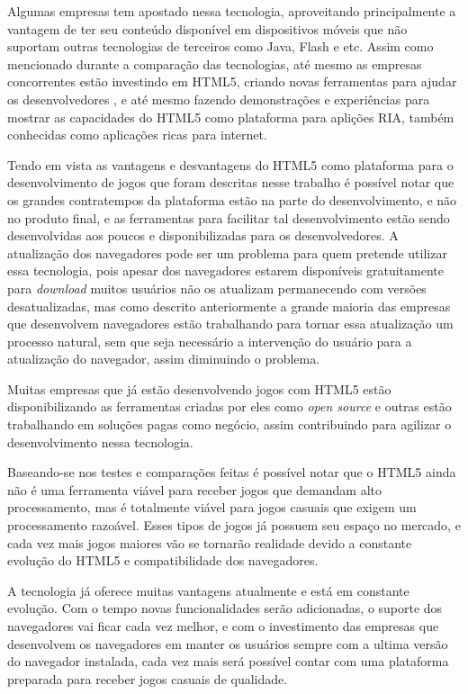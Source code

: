 Algumas empresas tem apostado nessa tecnologia, aproveitando
principalmente a vantagem de ter seu conteúdo disponível em
dispositivos móveis que não suportam outras tecnologias de terceiros
como Java, Flash e etc. Assim como mencionado durante a comparação das
tecnologias, até mesmo as empresas concorrentes estão investindo em
HTML5, criando novas ferramentas para ajudar
os desenvolvedores \cite{website:adobeedge}, e até mesmo fazendo
demonstrações e experiências para mostrar as capacidades do HTML5 como
plataforma para aplições RIA, também conhecidas como aplicações ricas
para internet.

Tendo em vista as vantagens e desvantagens do HTML5 como plataforma
para o desenvolvimento de jogos que foram descritas nesse trabalho é possível notar que os grandes
contratempos da plataforma estão na parte do desenvolvimento, e não no
produto final, e as ferramentas para facilitar tal desenvolvimento
estão sendo desenvolvidas aos poucos e disponibilizadas para os
desenvolvedores. A atualização dos navegadores pode ser um problema
para quem pretende utilizar essa tecnologia, pois apesar dos
navegadores estarem disponíveis gratuitamente para \textit{download}
muitos usuários não os atualizam permanecendo com versões
desatualizadas, mas como descrito anteriormente a grande maioria das empresas que desenvolvem
navegadores estão trabalhando para tornar essa atualização um processo
natural, sem que seja necessário a intervenção do usuário para a
atualização do navegador, assim diminuindo o problema.

Muitas empresas que já estão desenvolvendo jogos com HTML5
estão disponibilizando as ferramentas criadas por eles como
\textit{open source} e outras estão trabalhando em soluções pagas como
negócio, assim contribuindo para agilizar o desenvolvimento nessa
tecnologia.

Baseando-se nos testes e comparações feitas é possível notar que o
HTML5 ainda não é uma ferramenta viável para receber jogos que
demandam alto processamento, mas é totalmente viável para jogos
casuais que exigem um processamento razoável. Esses tipos de jogos já possuem seu espaço no
mercado, e cada vez mais jogos maiores vão se tornarão realidade devido a constante evolução
do HTML5 e compatibilidade dos navegadores.

A tecnologia já oferece muitas vantagens atualmente e está em
constante evolução. Com o tempo novas funcionalidades serão
adicionadas, o suporte dos navegadores vai ficar cada vez melhor, e
com o investimento das empresas que desenvolvem os navegadores em manter
os usuários sempre com a ultima versão do navegador instalada, cada vez
mais será possível contar com uma plataforma preparada para receber
jogos casuais de qualidade.

